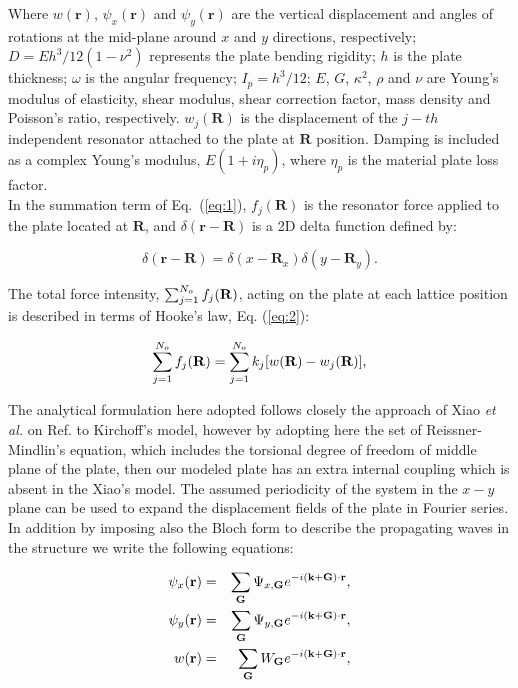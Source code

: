 \documentclass[a4paper]{ICEDyn}
\begin{document}
	Where $w(\mathbf{r})$, $\psi_x(\mathbf{r})$ and $\psi_y(\mathbf{r})$ are the vertical displacement and angles of rotations at the mid-plane around $ x $ and $ y $ directions, respectively; $ D = Eh^3/12(1-\nu^2) $ represents the plate bending rigidity; $ h $ is the plate thickness; $ \omega $ is the angular frequency;  $I_{p} = h^3/12 $;  $ E $, $ G $, $ \kappa^2 $, $ \rho $ and $ \nu $	are Young's modulus of elasticity, shear modulus, shear correction factor, mass density and Poisson's ratio, respectively. $w_j(\mathbf{R})$ is the displacement of the $j-th$ independent resonator attached to the plate at $\mathbf{R}$ position. Damping is included as a complex Young's modulus, $ E(1+i\eta_p) $, where $ \eta_p $ is the material plate loss factor.\\ 
	In the summation term of Eq.~(\ref{eq:1}), $f_j(\mathbf{R})$ is the resonator force applied to the plate located at $\mathbf{R} $, and $ \delta(\mathbf{r}-\mathbf{R}) $ is a 2D delta function defined by:
	
	\begin{equation} \label{eq:delta}
	\delta \left( \mathbf{r}-\mathbf{R}\right)   = \delta \left(x-\mathbf{R}_x\right) \delta \left( y-\mathbf{R}_y \right) .	
	\end{equation}   
		
	The total force intensity, $\sum_{j=1}^{N_o}f_{j}({\bf R})$, acting on the plate at each lattice position is described in terms of Hooke's law, Eq. (\ref{eq:2}):
	
	\begin{equation}\label{eq:2}
	\sum_{j=1}^{N_o}f_{j}({\bf R}) = \sum_{j=1}^{N_o}k_{j}[w({\bf R})-w_j({\bf R})],
    \end{equation}
	
    The analytical formulation here adopted follows closely the approach of Xiao {\it et al.} on Ref. \cite{Xiao2012s} to Kirchoff's model, however by adopting here the set of Reissner-Mindlin's equation, which includes the torsional degree of freedom of middle plane of the plate, then our modeled plate has an extra internal coupling which is absent in the Xiao's model.
    The assumed periodicity of the system in the $x-y$ plane can be used to expand the displacement fields of the plate in Fourier series. In addition by imposing also the Bloch form to describe the propagating waves in the structure we write the following equations:
	
	\begin{eqnarray}
	\psi_x({\bf r}) &=& \sum_{{\bf G}}\Psi_{{ x,{\bf G}}}e^{-i({\bf k}+{\bf G} )\cdot{\bf r}},\label{eq:3}\\
	\psi_y({\bf r}) &=& \sum_{{\bf G}}\Psi_{{ y,{\bf G}}}e^{-i({\bf k}+{\bf G} ) \cdot{\bf r}}\label{eq:4},\\
	w({\bf r}) &=& \sum_{{\bf G}}W_{{\bf G}}e^{-i\left( {\bf k}+{\bf G}\right) \cdot{\bf r}}\label{eq:5},
	\end{eqnarray}
	
\end{document}
